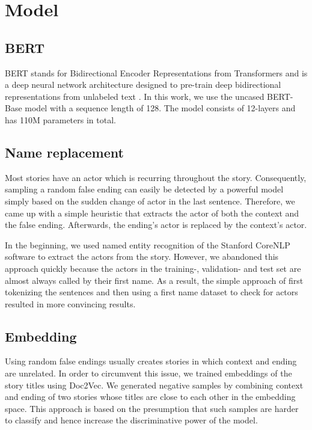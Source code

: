 \documentclass{article}
\begin{document}
\section{Model}\label{sec:model}

\subsection{BERT}\label{ssec:bert}
BERT stands for Bidirectional Encoder Representations from Transformers
and is a deep neural network architecture designed to pre-train deep bidirectional representations from unlabeled text \cite{BERT}. 
In this work, we use the uncased BERT-Base model with a sequence length of 128.
The model consists of 12-layers and has 110M parameters in total.

\subsection{Name replacement}\label{ssec:namerepl}
Most stories have an actor which is recurring throughout the story.
Consequently, sampling a random false ending can easily be detected by a powerful model simply based on the sudden change of actor in the last sentence.
Therefore, we came up with a simple heuristic that extracts the actor of both the context and the false ending. Afterwards, the ending's actor is replaced by the context's actor.

In the beginning, we used named entity recognition of the Stanford CoreNLP software \cite{finkel-etal-2005-incorporating} to extract the actors from the story.
However, we abandoned this approach quickly because the actors in the training-, validation- and test set are almost always called by their first name.
As a result, the simple approach of first tokenizing the sentences and then using a first name dataset \cite{Name_database} to check for actors resulted in more convincing results.

\subsection{Embedding}\label{ssec:embedding}

Using random false endings usually creates stories in which context and ending are unrelated. In order to circumvent this issue, we trained embeddings of the story titles using Doc2Vec\cite{Doc2Vec}. We generated negative samples by combining context and ending of two stories whose titles are close to each other in the embedding space. This approach is based on the presumption that such samples are harder to classify and hence increase the discriminative power of the model.
\end{document}
